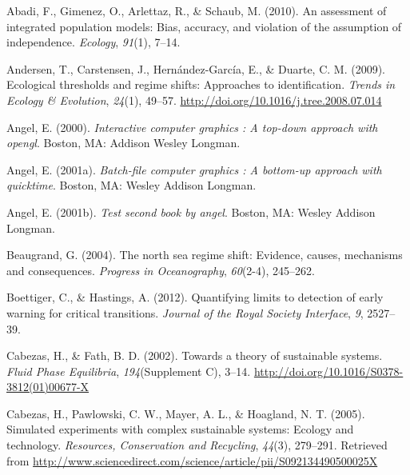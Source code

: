 \documentclass[12pt,twoside]{reedthesis}
\begin{document}

\noindent

\setlength{\parindent}{-0.20in} \setlength{\leftskip}{0.20in}
\setlength{\parskip}{8pt}

\hypertarget{refs}{}
\hypertarget{ref-abadi2010assessment}{}
Abadi, F., Gimenez, O., Arlettaz, R., \& Schaub, M. (2010). An
assessment of integrated population models: Bias, accuracy, and
violation of the assumption of independence. \emph{Ecology},
\emph{91}(1), 7--14.

\hypertarget{ref-andersen_ecological_2009}{}
Andersen, T., Carstensen, J., Hernández-García, E., \& Duarte, C. M.
(2009). Ecological thresholds and regime shifts: Approaches to
identification. \emph{Trends in Ecology \& Evolution}, \emph{24}(1),
49--57. \url{http://doi.org/10.1016/j.tree.2008.07.014}

\hypertarget{ref-angel2000}{}
Angel, E. (2000). \emph{Interactive computer graphics : A top-down
approach with opengl}. Boston, MA: Addison Wesley Longman.

\hypertarget{ref-angel2001}{}
Angel, E. (2001a). \emph{Batch-file computer graphics : A bottom-up
approach with quicktime}. Boston, MA: Wesley Addison Longman.

\hypertarget{ref-angel2002a}{}
Angel, E. (2001b). \emph{Test second book by angel}. Boston, MA: Wesley
Addison Longman.

\hypertarget{ref-beaugrand2004north}{}
Beaugrand, G. (2004). The north sea regime shift: Evidence, causes,
mechanisms and consequences. \emph{Progress in Oceanography},
\emph{60}(2-4), 245--262.

\hypertarget{ref-boettiger_quantifying_2012}{}
Boettiger, C., \& Hastings, A. (2012). Quantifying limits to detection
of early warning for critical transitions. \emph{Journal of the Royal
Society Interface}, \emph{9}, 2527--39.

\hypertarget{ref-cabezas_towards_2002}{}
Cabezas, H., \& Fath, B. D. (2002). Towards a theory of sustainable
systems. \emph{Fluid Phase Equilibria}, \emph{194}(Supplement C), 3--14.
\url{http://doi.org/10.1016/S0378-3812(01)00677-X}

\hypertarget{ref-cabezas_simulated_2005}{}
Cabezas, H., Pawlowski, C. W., Mayer, A. L., \& Hoagland, N. T. (2005).
Simulated experiments with complex sustainable systems: Ecology and
technology. \emph{Resources, Conservation and Recycling}, \emph{44}(3),
279--291. Retrieved from
\url{http://www.sciencedirect.com/science/article/pii/S092134490500025X}
\end{document}
